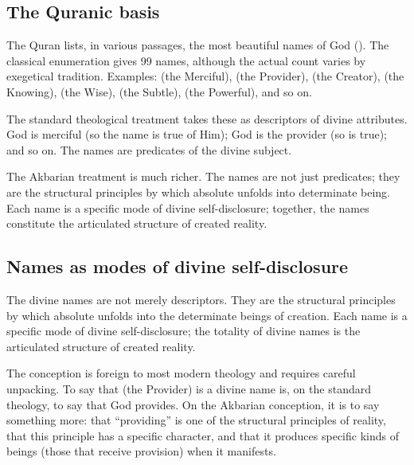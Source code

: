 \subsection{The Quranic basis}

The Quran lists, in various passages, the most beautiful names of
God (). The classical enumeration gives 99
names, although the actual count varies by exegetical tradition.
Examples:  (the Merciful),  (the
Provider),  (the Creator),  (the
Knowing),  (the Wise),  (the Subtle),
 (the Powerful), and so on.

The standard theological treatment takes these as descriptors of
divine attributes. God is merciful (so the name  is
true of Him); God is the provider (so  is true);
and so on. The names are predicates of the divine subject.

The Akbarian treatment is much richer. The names are not just
predicates; they are the structural principles by which absolute
 unfolds into determinate being. Each name is a specific
mode of divine self-disclosure; together, the names constitute the
articulated structure of created reality.

\subsection{Names as modes of divine self-disclosure}

\begin{conceptbox}
\label{conc:divine-names}
The divine names are not merely descriptors. They are the structural
principles by which absolute  unfolds into the
determinate beings of creation. Each name is a specific mode of
divine self-disclosure; the totality of divine names is the
articulated structure of created reality.
\end{conceptbox}

The conception is foreign to most modern theology and requires
careful unpacking. To say that  (the Provider) is a
divine name is, on the standard theology, to say that God provides.
On the Akbarian conception, it is to say something more: that
``providing'' is one of the structural principles of reality, that
this principle has a specific character, and that it produces
specific kinds of beings (those that receive provision) when it
manifests.


